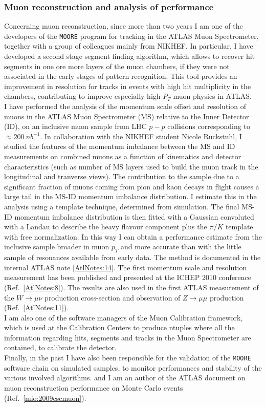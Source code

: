 \documentclass{article}
\begin{document}
\begin{vita}
\subsubsection*{Muon reconstruction and analysis of performance}
Concerning muon reconstruction, since more than two years I am one of the developers of the 
{\tt MOORE} program for tracking in the ATLAS Muon Spectrometer, together with a group of colleagues
 mainly from NIKHEF. 
In particular, I have developed a second stage segment finding algorithm, 
which allows to recover hit segments in one ore more layers
of the muon chambers, if they were not associated in the early stages of pattern recognition.
 This tool provides an improvement in resolution for tracks in events with high hit multiplicity in the 
chambers, contributing to improve especially high-$P_{T}$ muon physics in ATLAS. \\
I have performed the analysis of the momentum scale offset and resolution of muons in the ATLAS Muon Spectrometer (MS) relative to the Inner Detector (ID),
on an inclusive muon sample from LHC $p-p$ collisions corresponding to 
$\approx 200~nb^{-1}$. In collaboration with the NIKHEF student Nicole Ruckstuhl, I studied the features of 
the momentum imbalance between the MS and ID measurements on combined muons as a function of kinematics and 
detector characteristics (such as number of MS layers used to build the muon track in the longitudinal and tranverse views). The contribution to the sample due
to a significant fraction of muons coming from pion and kaon decays in flight causes a large tail in the MS-ID momentum imbalance distribution. I estimate this
in the analysis using a template technique, determined from simulation. The final MS-ID momentum imbalance distribution is then fitted with a Gaussian
convoluted with a Landau to describe the heavy flavour component plus the $\pi /K$ template with free normalization. In this way I can obtain a performance estimate 
from the inclusive sample broader in muon $p_{T}$ and more accurate than with the little sample of resonances available from early data. The method is documented in the internal ATLAS note \ref{AtlNotes:14}. The first momentum scale and 
resolution measurement has been published and presented at the ICHEP 2010 conference (Ref.~\ref{AtlNotes:8}). The results are also used 
in the first ATLAS measurement of the $W \rightarrow \mu\nu$ production cross-section and observation of $Z \rightarrow \mu\mu$ production (Ref.~\ref{AtlNotes:11}). \\
I am also one of the software managers of the Muon Calibration framework, which is used at the Calibration
Centers to produce ntuples where all the information regarding hits, segments and tracks in the Muon Spectrometer are 
contained, to calibrate the detector. \\
Finally, in the past I have also been responsible for the validation of the {\tt MOORE}  software chain on simulated samples, 
to monitor performances and stability of the various involved algorithms. and I am an author of the ATLAS document on muon reconstruction performance
 on Monte Carlo events (Ref.~\ref{mio:2009cscmuon}).\\


\end{vita}
\end{document}
